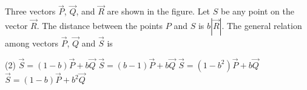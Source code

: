 
    \item Three vectors \( \vec{P} \), \( \vec{Q} \), and \( \vec{R} \) are shown in the figure. Let \( S \) be any point on the vector \( \vec{R} \). The distance between the points \( P \) and \( S \) is \( b|\vec{R}| \). The general relation among vectors \( \vec{P} \), \( \vec{Q} \) and \( \vec{S} \) is
        \begin{tasks}(2)
            \task \( \vec{S} = (1 - b)\vec{P} + b\vec{Q} \)
            \task \( \vec{S} = (b - 1)\vec{P} + b\vec{Q} \)
            \task \( \vec{S} = (1 - b^2)\vec{P} + b\vec{Q} \)
            \task \( \vec{S} = (1 - b)\vec{P} + b^2\vec{Q} \)
        \end{tasks}

\begin{center}
\end{center}